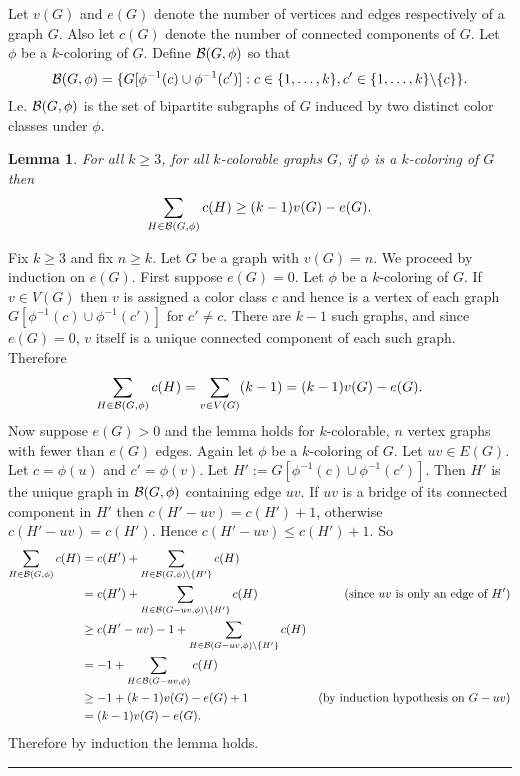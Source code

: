 \documentclass[letterpaper,12pt,oneside,onecolumn]{article}
\newenvironment{proof}{{\bf Proof:  }}{\hfill\rule{2mm}{2mm}}
\newtheorem{lemma}[fact]{Lemma}
\begin{document}
\section{}
\paragraph{}
Let $v(G)$ and $e(G)$ denote the number of vertices and edges respectively of a graph $G$. Also let $c(G)$ denote the number of connected components of $G$. Let $\phi$ be a $k$-coloring of $G$. Define $\mathcal{B}(G, \phi)$ so that
$$\mathcal{B}(G,\phi) = \{G[\phi^{-1}(c) \cup \phi^{-1}(c')] : c \in \{1,\dots, k\}, c'\in \{1,\dots, k\}\backslash\{c\}\}.$$
I.e. $\mathcal{B}(G,\phi)$ is the set of bipartite subgraphs of $G$ induced by two distinct color classes under $\phi$.
\begin{lemma}\label{lemma:bipartite-cc}
For all $k \geq 3$, for all $k$-colorable graphs $G$, if $\phi$ is a $k$-coloring of $G$ then
$$\sum_{H \in \mathcal{B}(G,\phi)} c(H) \geq (k-1)v(G) - e(G).$$
\end{lemma}
\begin{proof}
Fix $k \geq 3$ and fix $n \geq k$. Let $G$ be a graph with $v(G) = n$. We proceed by induction on $e(G)$. First suppose $e(G) = 0$. Let $\phi$ be a $k$-coloring of $G$. If $v \in V(G)$ then $v$ is assigned a color class $c$ and hence is a vertex of each graph $G[\phi^{-1}(c) \cup \phi^{-1}(c')]$ for $c' \neq c$. There are $k-1$ such graphs, and since $e(G) = 0$, $v$ itself is a unique connected component of each such graph. Therefore
$$\sum_{H \in \mathcal{B}(G,\phi)} c(H)= \sum_{v \in V(G)} (k-1) = (k-1)v(G) - e(G).$$
Now suppose $e(G) >0$ and the lemma holds for $k$-colorable, $n$ vertex graphs with fewer than $e(G)$ edges. Again let $\phi$ be a $k$-coloring of $G$. Let $uv \in E(G)$. Let $c = \phi(u)$ and $c' = \phi(v)$. Let $H' := G[\phi^{-1}(c) \cup \phi^{-1}(c')]$. Then $H'$ is the unique graph in $\mathcal{B}(G,\phi)$ containing edge $uv$. If $uv$ is a bridge of its connected component in $H'$ then $c(H'-uv) = c(H') + 1$, otherwise $c(H'-uv) = c(H')$. Hence $c(H'-uv) \leq c(H')+1$. So
\begin{align*}
\sum_{H \in \mathcal{B}(G,\phi)} c(H) &= c(H') + \sum_{H \in \mathcal{B}(G, \phi)\backslash\{H'\}} c(H)\\
&= c(H') +  \sum_{H \in \mathcal{B}(G-uv, \phi)\backslash\{H'\}} c(H) &\text{(since $uv$ is only an edge of $H'$)}\\ 
&\geq c(H'-uv)-1 +  \sum_{H \in \mathcal{B}(G-uv, \phi)\backslash\{H'\}} c(H)\\
&=  -1 + \sum_{H \in \mathcal{B}(G-uv, \phi)} c(H)\\
&\geq - 1 + (k-1)v(G) - e(G) + 1 &\text{(by induction hypothesis on $G-uv$)}\\
&= (k-1)v(G) - e(G).
\end{align*}
Therefore by induction the lemma holds.
\end{proof}
\end{document}
